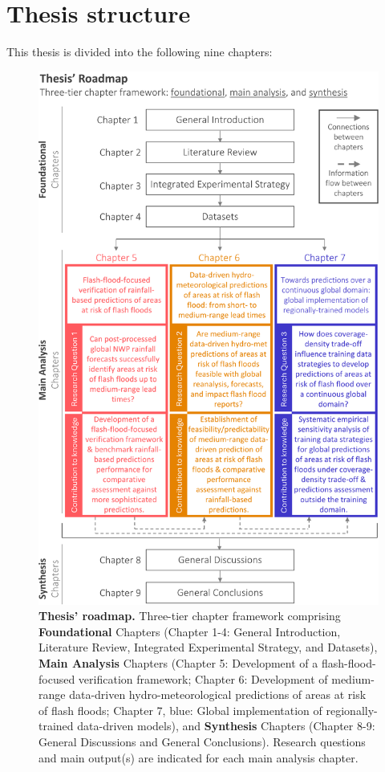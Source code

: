  
\section{Thesis structure}
This thesis is divided into the following nine chapters:

\begin{figure}[htbp]
\centering
\includegraphics[width=\textwidth]{thesis_roadmap.png}
\caption{\textbf{Thesis' roadmap.} Three-tier chapter framework comprising \textbf{Foundational} Chapters (Chapter 1-4: General Introduction, Literature Review, Integrated Experimental Strategy, and Datasets), \textbf{Main Analysis} Chapters (\textcolor{colour_chapter5}{Chapter 5: Development of a flash-flood-focused verification framework}; \textcolor{colour_chapter6}{Chapter 6: Development of medium-range data-driven hydro-meteorological predictions of areas at risk of flash floods}; \textcolor{colour_chapter7}{Chapter 7, blue: Global implementation of regionally-trained data-driven models}), and \textbf{Synthesis} Chapters (Chapter 8-9: General Discussions and General Conclusions). Research questions and main output(s) are indicated for each main analysis chapter.}
\label{fig:thesis_structure}
\end{figure}

